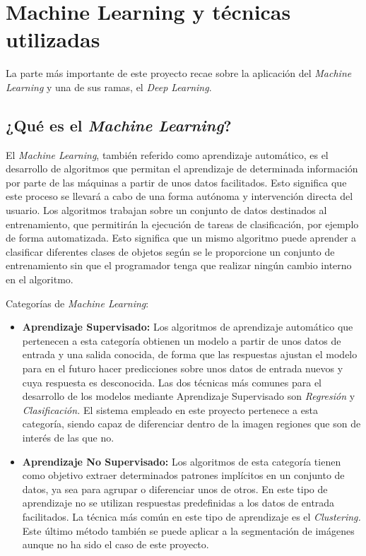 
\section{Machine Learning y técnicas utilizadas}

La parte más importante de este proyecto recae sobre la aplicación del \emph{Machine Learning} y una de sus ramas, el \emph{Deep Learning}.

\subsection{¿Qué es el \emph{Machine Learning}?}
El \emph{Machine Learning}, también referido como aprendizaje automático, es el desarrollo de algoritmos que permitan el aprendizaje de determinada información por parte de las máquinas a partir de unos datos facilitados. Esto significa que este proceso se llevará a cabo de una forma autónoma y intervención directa del usuario. 
Los algoritmos trabajan sobre un conjunto de datos destinados al entrenamiento, que permitirán la ejecución de tareas de clasificación, por ejemplo de forma automatizada. 
Esto significa que un mismo algoritmo puede aprender a clasificar diferentes clases de objetos según se le proporcione un conjunto de entrenamiento sin que el programador tenga que realizar ningún cambio interno en el algoritmo.

Categorías de \emph{Machine Learning}:

\begin{itemize}
    \item \textbf{Aprendizaje Supervisado:} Los algoritmos de aprendizaje automático que pertenecen a esta categoría obtienen un modelo a partir de unos datos de entrada y una salida conocida, de forma que las respuestas ajustan el modelo para en el futuro hacer predicciones sobre unos datos de entrada nuevos y cuya respuesta es desconocida.
    Las dos técnicas más comunes para el desarrollo de los modelos mediante Aprendizaje Supervisado son \emph{Regresión} y \emph{Clasificación.}
    El sistema empleado en este proyecto pertenece a esta categoría, siendo capaz de diferenciar dentro de la imagen regiones que son de interés de las que no.
    
    \item \textbf{Aprendizaje No Supervisado:} Los algoritmos de esta categoría tienen como objetivo extraer determinados patrones implícitos en un conjunto de datos, ya sea para agrupar o diferenciar unos de otros. En este tipo de aprendizaje no se utilizan respuestas predefinidas a los datos de entrada facilitados. La técnica más común en este tipo de aprendizaje es el \emph{Clustering.} Este último método también se puede aplicar a la segmentación de imágenes aunque no ha sido el caso de este proyecto.\cite{ML:machinelearning_conceptos}

\end{itemize}

